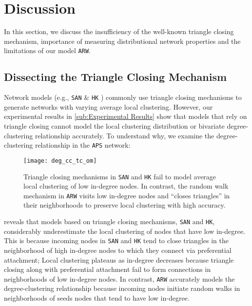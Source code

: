 
\section{Discussion}
\label{sec:Discussion}
In this section, we discuss the insufficiency of the well-known triangle closing mechanism,
importance of measuring distributional network properties
and the limitations of our model \texttt{ARW}.

\subsection{Dissecting the Triangle Closing Mechanism}
\label{ss:tc}

Network models (e.g., \texttt{SAN} \cite{gong2012evolution} \& \texttt{HK} \cite{holme2002growing})
commonly use triangle closing mechanisms to generate networks with
varying average local clustering. However, our experimental results
in \cref{sub:Experimental Results} show that models that rely on triangle closing
cannot model the local clustering distribution or bivariate degree-clustering
relationship accurately. To understand why, we examine the degree-clustering
relationship in the \texttt{APS} network:
\vspace{-2mm}
\begin{figure}[H]
    \centering
    \texttt{[image: deg\_cc\_tc\_om]}
    \caption{Triangle closing mechanisms in \texttt{SAN} and \texttt{HK} fail to
    model average local clustering of low in-degree nodes. In contrast, the random walk
    mechanism in \texttt{ARW} visits low in-degree nodes and ``closes triangles'' in
    their neighborhoods to preserve local clustering with high accuracy.}
    \label{fig:triangle_closing}
\end{figure}

 reveals that models based on triangle closing mechanisms,
\texttt{SAN} and \texttt{HK}, considerably underestimate the local clustering of
nodes that have low in-degree. This is because incoming nodes in \texttt{SAN} and \texttt{HK}
tend to close triangles in the neighborhood of high in-degree nodes to which they
connect via preferential attachment; Local clustering plateaus as in-degree decreases because
triangle closing along with preferential attachment fail to form connections in neighborhoods
of low in-degree nodes. In contrast, \texttt{ARW} accurately models the degree-clustering relationship
because incoming nodes initiate random walks in neighborhoods of seeds nodes that tend to have
low in-degree.

